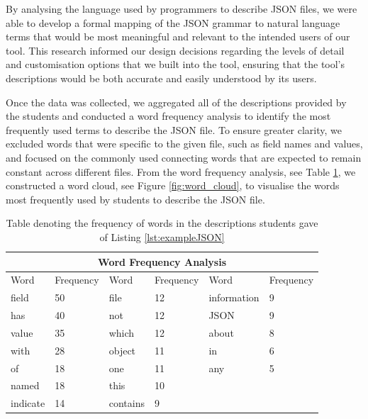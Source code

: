 \documentclass{l4proj}
\begin{document}
By analysing the language used by programmers to describe JSON files, we were able to develop a formal mapping of the JSON grammar to natural language terms that would be most meaningful and relevant to the intended users of our tool. This research informed our design decisions regarding the levels of detail and customisation options that we built into the tool, ensuring that the tool's descriptions would be both accurate and easily understood by its users. 

Once the data was collected, we aggregated all of the descriptions provided by the students and conducted a word frequency analysis to identify the most frequently used terms to describe the JSON file. To ensure greater clarity, we excluded words that were specific to the given file, such as field names and values, and focused on the commonly used connecting words that are expected to remain constant across different files. From the word frequency analysis, see Table \ref{table:WordFrequency}, we constructed a word cloud, see Figure \ref{fig:word_cloud}, to visualise the words most frequently used by students to describe the JSON file.

\begin{table}[ht]
\small
\caption{Table denoting the frequency of words in the descriptions students gave of Listing \ref{lst:exampleJSON}}
\centering
\begin{tabular}{ |p{1.5cm}|p{1.5cm}||p{1.5cm}|p{1.5cm}||p{1.5cm}|p{1.5cm}| }

\multicolumn{6}{c}{Word Frequency Analysis} \\
\hline
Word& Frequency &Word &Frequency&Word&Frequency\\
\hline
field   & 50&file & 12& information&9\\
has & 40 & not & 12&JSON & 9\\
value & 35 & which & 12& about & 8\\
with & 28& object & 11&in &6\\
of & 18&one & 11&any&5\\
named & 18&this & 10&&\\
indicate & 14&contains&9&&\\

\hline
\end{tabular}
\label{table:WordFrequency}
\end{table}

\end{document}
